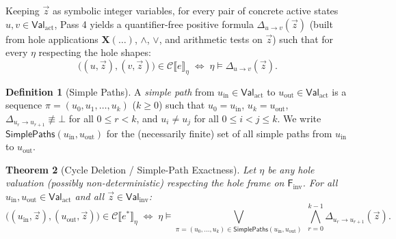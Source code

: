 \documentclass[11pt,a4paper]{article}
\newtheorem{theorem}{Theorem}[section]
\theoremstyle{definition}
\newtheorem{definition}[theorem]{Definition}
\theoremstyle{remark}
\newcommand{\Val}{\mathsf{Val}}
\newcommand{\Csem}[1]{\mathcal{C}\llbracket #1 \rrbracket}
\begin{document}
Keeping $\vec{z}$ as symbolic integer variables, for every pair of concrete active states
$u, v \in \Val_{\mathrm{act}}$, Pass 4 yields a quantifier-free positive formula
$\Delta_{u \to v}(\vec{z})$ (built from hole applications $\mathbf{X}(\dots)$, $\land$, $\lor$, and
arithmetic tests on $\vec{z}$) such that for every $\eta$ respecting the hole shapes:
\[
  \bigl((u, \vec{z}), (v, \vec{z})\bigr) \in \Csem{e}_\eta
  \;\iff\;
  \eta \models \Delta_{u \to v}(\vec{z}).
\]

\begin{definition}[Simple Paths]
A \emph{simple path} from $u_{\mathrm{in}} \in \Val_{\mathrm{act}}$ to $u_{\mathrm{out}} \in \Val_{\mathrm{act}}$
is a sequence $\pi = (u_0, u_1, \dots, u_k)$ ($k \ge 0$) such that $u_0 = u_{\mathrm{in}}$,
$u_k = u_{\mathrm{out}}$, $\Delta_{u_r \to u_{r+1}} \not\equiv \bot$ for all $0 \le r < k$, and
$u_i \neq u_j$ for all $0 \le i < j \le k$. We write $\mathsf{SimplePaths}(u_{\mathrm{in}}, u_{\mathrm{out}})$
for the (necessarily finite) set of all simple paths from $u_{\mathrm{in}}$ to $u_{\mathrm{out}}$.
\end{definition}

\begin{theorem}[Cycle Deletion / Simple-Path Exactness]
\label{thm:simple-paths}
Let $\eta$ be any hole valuation (possibly \emph{non-deterministic}) respecting the hole frame on
$\mathsf{F}_{\mathrm{inv}}$. For all $u_{\mathrm{in}}, u_{\mathrm{out}} \in \Val_{\mathrm{act}}$ and
all $\vec{z} \in \Val_{\mathrm{inv}}$:
\[
  \bigl((u_{\mathrm{in}}, \vec{z}), (u_{\mathrm{out}}, \vec{z})\bigr) \in \Csem{e^*}_\eta
  \;\iff\;
  \eta \models \bigvee_{\pi = (u_0,\dots,u_k) \in \mathsf{SimplePaths}(u_{\mathrm{in}}, u_{\mathrm{out}})}
  \;\bigwedge_{r=0}^{k-1} \Delta_{u_r \to u_{r+1}}(\vec{z}).
\]
\end{theorem}
\end{document}
